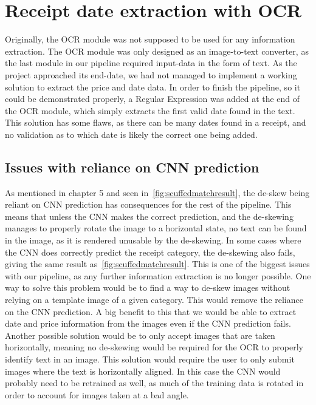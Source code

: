 \section{Receipt date extraction with OCR}\label{sec:receipt-date-extraction-with-ocr}
Originally, the OCR module was not supposed to be used for any information extraction.
The OCR module was only designed as an image-to-text converter, as the last module in our pipeline required input-data in the form of text.
As the project approached its end-date, we had not managed to implement a working solution to extract the price and date data.
In order to finish the pipeline, so it could be demonstrated properly, a Regular Expression was added at the end of the OCR module, which simply extracts the first valid date found in the text.
This solution has some flaws, as there can be many dates found in a receipt, and no validation as to which date is likely the correct one being added.

\subsection{Issues with reliance on CNN prediction}\label{subsec:issues-with-reliance-on-cnn-prediction}
As mentioned in chapter 5 and seen in~\ref{fig:scuffedmatchresult}, the de-skew being reliant on CNN prediction has consequences for the rest of the pipeline.
This means that unless the CNN makes the correct prediction, and the de-skewing manages to properly rotate the image to a horizontal state, no text can be found in the image, as it is rendered unusable by the de-skewing.
In some cases where the CNN does correctly predict the receipt category, the de-skewing also fails, giving the same result as~\ref{fig:scuffedmatchresult}.
This is one of the biggest issues with our pipeline, as any further information extraction is no longer possible.
One way to solve this problem would be to find a way to de-skew images without relying on a template image of a given category.
This would remove the reliance on the CNN prediction.
A big benefit to this that we would be able to extract date and price information from the images even if the CNN prediction fails.
Another possible solution would be to only accept images that are taken horizontally, meaning no de-skewing would be required for the OCR to properly identify text in an image.
This solution would require the user to only submit images where the text is horizontally aligned.
In this case the CNN would probably need to be retrained as well, as much of the training data is rotated in order to account for images taken at a bad angle.

